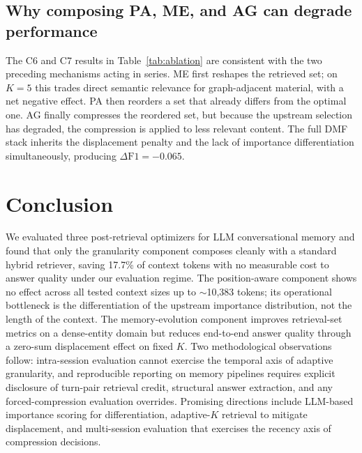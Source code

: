 \documentclass[conference]{IEEEtran}
\begin{document}
\subsection{Why composing PA, ME, and AG can degrade performance}

The C6 and C7 results in Table~\ref{tab:ablation} are consistent with the two preceding mechanisms acting in series. ME first reshapes the retrieved set; on $K{=}5$ this trades direct semantic relevance for graph-adjacent material, with a net negative effect. PA then reorders a set that already differs from the optimal one. AG finally compresses the reordered set, but because the upstream selection has degraded, the compression is applied to less relevant content. The full DMF stack inherits the displacement penalty and the lack of importance differentiation simultaneously, producing $\Delta\mathrm{F1}=-0.065$.

\section{Conclusion}
\label{sec:conclusion}

We evaluated three post-retrieval optimizers for LLM conversational memory and found that only the granularity component composes cleanly with a standard hybrid retriever, saving 17.7\% of context tokens with no measurable cost to answer quality under our evaluation regime. The position-aware component shows no effect across all tested context sizes up to $\sim$10{,}383 tokens; its operational bottleneck is the differentiation of the upstream importance distribution, not the length of the context. The memory-evolution component improves retrieval-set metrics on a dense-entity domain but reduces end-to-end answer quality through a zero-sum displacement effect on fixed $K$. Two methodological observations follow: intra-session evaluation cannot exercise the temporal axis of adaptive granularity, and reproducible reporting on memory pipelines requires explicit disclosure of turn-pair retrieval credit, structural answer extraction, and any forced-compression evaluation overrides. Promising directions include LLM-based importance scoring for differentiation, adaptive-$K$ retrieval to mitigate displacement, and multi-session evaluation that exercises the recency axis of compression decisions.
\end{document}

